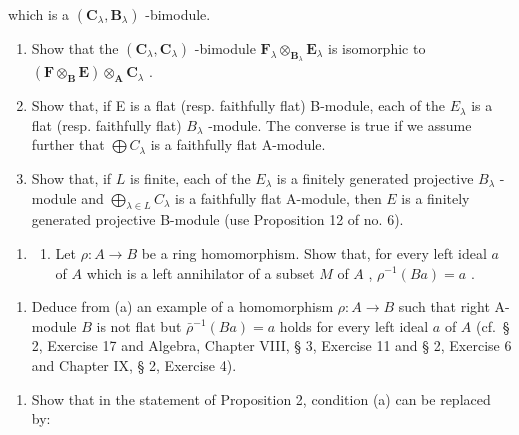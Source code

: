 which is a \((\mathbf{C}_{\lambda},\mathbf{B}_{\lambda})\) -bimodule.

\begin{enumerate}
\def\labelenumi{(\alph{enumi})}
\item
  Show that the \((\mathbf{C}_{\lambda},\mathbf{C}_{\lambda})\) -bimodule \(\mathbf{F}_{\lambda}\otimes_{\mathbf{B}_{\lambda}}\mathbf{E}_{\lambda}\) is isomorphic to \((\mathbf{F}\otimes_{\mathbf{B}}\mathbf{E})\otimes_{\mathbf{A}}\mathbf{C}_{\lambda}\) .
\item
  Show that, if E is a flat (resp. faithfully flat) B-module, each of the \(E_{\lambda}\) is a flat (resp. faithfully flat) \(B_{\lambda}\) -module. The converse is true if we assume further that \(\bigoplus C_{\lambda}\) is a faithfully flat A-module.
\item
  Show that, if \(L\) is finite, each of the \(E_{\lambda}\) is a finitely generated projective \(B_{\lambda}\) -module and \(\bigoplus_{\lambda \in L} C_{\lambda}\) is a faithfully flat A-module, then \(E\) is a finitely generated projective B-module (use Proposition 12 of no. 6).
\end{enumerate}

\begin{enumerate}
\def\labelenumi{\arabic{enumi}.}
\setcounter{enumi}{9}
\tightlist
\item
  \begin{enumerate}
  \def\labelenumii{(\alph{enumii})}
  \tightlist
  \item
    Let \(\rho: A \to B\) be a ring homomorphism. Show that, for every left ideal \(a\) of \(A\) which is a left annihilator of a subset \(M\) of \(A\) , \(\rho^{-1}(Ba) = a\) .
  \end{enumerate}
\end{enumerate}

\begin{enumerate}
\def\labelenumi{(\alph{enumi})}
\setcounter{enumi}{1}
\tightlist
\item
  Deduce from (a) an example of a homomorphism \(\rho: A \to B\) such that right A-module \(B\) is not flat but \(\bar{\rho}^{-1}(Ba) = a\) holds for every left ideal \(a\) of \(A\) (cf.~§ 2, Exercise 17 and Algebra, Chapter VIII, § 3, Exercise 11 and § 2, Exercise 6 and Chapter IX, § 2, Exercise 4).
\end{enumerate}


\begin{enumerate}
\def\labelenumi{\arabic{enumi}.}
\tightlist
\item
  Show that in the statement of Proposition 2, condition (a) can be replaced by:
\end{enumerate}

